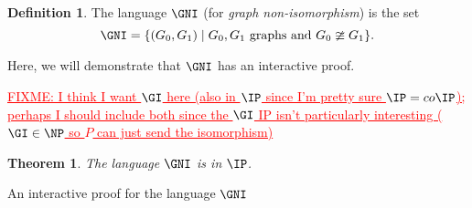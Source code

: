 \documentclass[english,12pt]{reedthesis}
\theoremstyle{plain}
\newtheorem{thm}{Theorem}[section]
\theoremstyle{definition}
\newtheorem{defn}[defn]{Definition}
\theoremstyle{remark}
\DeclarePairedDelimiter{\abs}{\lvert}{\rvert}
\newcommand{\FIXME}[1]{\textcolor{red}{\ul{FIXME: #1}}}
\begin{document}
\begin{defn}\label{def:gni}
  The language $\GNI$ (for \emph{graph non-isomorphism}) is the set
  \[
    \GNI = \{(G_{0}, G_{1}) \mid G_{0}, G_{1} \text{ graphs and } G_{0} \ncong G_{1}\}.
  \]
\end{defn}

Here, we will demonstrate that $\GNI$ has an interactive proof.

\FIXME{I think I want $\GI$ here (also in $\IP$ since I'm pretty sure
  $\IP = co\IP$); perhaps I should include both since the $\GI$ IP isn't
  particularly interesting ($\GI \in \NP$ so $P$ can just send the isomorphism)}
\begin{thm}\label{thm:gni-ip}
  The language $\GNI$ is in $\IP$.
\end{thm}

\begin{algorithm}[htbp]
  \Accept\;
  \caption{An interactive proof for the language $\GNI$}\label{alg:gni-ip}
\end{algorithm}
\end{document}
